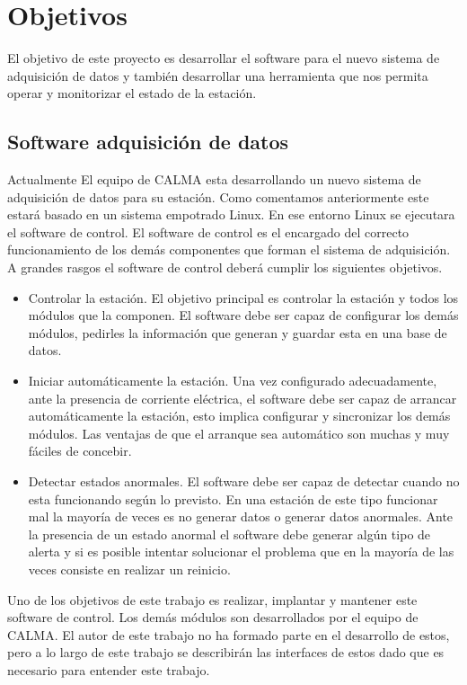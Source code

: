 \section{Objetivos}
	El objetivo de este proyecto es desarrollar el software para el nuevo sistema de adquisición de datos y también desarrollar una herramienta
	que nos permita operar y monitorizar el estado de la estación. 
	\subsection{Software adquisición de datos}
		Actualmente El equipo de CALMA esta desarrollando un nuevo sistema de adquisición de datos para su estación. Como comentamos
		anteriormente este estará basado en un sistema empotrado Linux. En ese entorno Linux se ejecutara el software de control. El software
		de control es el encargado del correcto funcionamiento de los demás componentes que forman el sistema de adquisición. A grandes rasgos
		el software de control deberá cumplir los siguientes objetivos.
		\begin{itemize}
			\item 	Controlar la estación. El objetivo principal es controlar la estación y todos los módulos que la componen. El software
			  	debe ser capaz de configurar los demás módulos, pedirles la información que generan y guardar esta en una base de datos. 
			\item 	Iniciar automáticamente la estación. Una vez configurado adecuadamente, ante la presencia de corriente eléctrica, el
			  	software debe ser capaz de arrancar automáticamente la estación, esto implica configurar y sincronizar los demás
				módulos. Las ventajas de que el arranque sea automático son muchas y muy fáciles de concebir.
			\item 	Detectar estados anormales. El software debe ser capaz de detectar cuando no esta funcionando según lo previsto. En
			  	una estación de este tipo funcionar mal la mayoría de veces es no generar datos o generar datos anormales. Ante la
				presencia de un estado anormal el software debe generar algún tipo de alerta y si es posible intentar solucionar el
				problema que en la mayoría de las veces consiste en realizar un reinicio.
		\end{itemize}
		Uno de los objetivos de este trabajo es realizar, implantar y mantener este software de control. Los demás módulos son desarrollados
		por el equipo de CALMA. El autor de este trabajo no ha formado parte en el desarrollo de estos, pero a lo largo de este trabajo se
		describirán las interfaces de estos dado que es necesario para entender este trabajo. 
